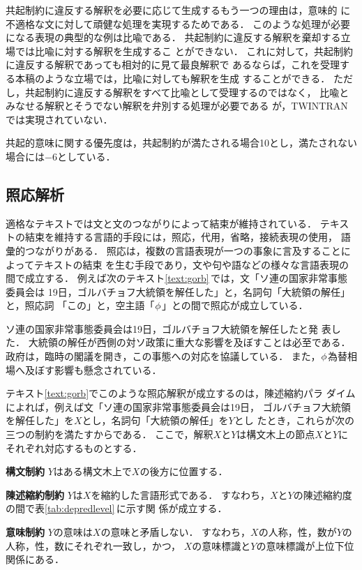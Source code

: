 共起制約に違反する解釈を必要に応じて生成するもう一つの理由は，意味的
に不適格な文に対して頑健な処理を実現するためである．
このような処理が必要になる表現の典型的な例は比喩である．
共起制約に違反する解釈を棄却する立場では比喩に対する解釈を生成するこ
とができない．
これに対して，共起制約に違反する解釈であっても相対的に見て最良解釈で
あるならば，これを受理する本稿のような立場では，比喩に対しても解釈を生成
することができる．
ただし，共起制約に違反する解釈をすべて比喩として受理するのではなく，
比喩とみなせる解釈とそうでない解釈を弁別する処理が必要である
\cite{Wilks78,Ferrari96}が，TWINTRANでは実現されていない．

共起的意味に関する優先度は，共起制約が満たされる場合10とし，満たされない
場合には$-6$としている．

\subsection{照応解析}
\label{sec:analysis:integ:cor}

適格なテキストでは文と文のつながりによって結束が維持されている．
テキストの結束を維持する言語的手段には，照応，代用，省略，接続表現の使用，
語彙的つながりがある\cite{Halliday76}．
照応は，複数の言語表現が一つの事象に言及することによってテキストの結束
を生む手段であり，文や句や語などの様々な言語表現の間で成立する．
例えば次のテキスト\ref{text:gorb}\,では，文「ソ連の国家非常事態委員会は
19日，ゴルバチョフ大統領を解任した」と，名詞句「大統領の解任」と，照応詞
「この」と，空主語「$\phi_{}$」との間で照応が成立している．
\begin{TEXT}
\text ソ連の国家非常事態委員会は19日，ゴルバチョフ大統領を解任したと発
表した．
大統領の解任が西側の対ソ政策に重大な影響を及ぼすことは必至である．
政府は，臨時の閣議を開き，この事態への対応を協議している．
また，$\phi_{}$為替相場へ及ぼす影響も懸念されている．
\label{text:gorb}
\end{TEXT}
テキスト\ref{text:gorb}でこのような照応解釈が成立するのは，陳述縮約パラ
ダイム\cite{Jelinek95}によれば，例えば文「ソ連の国家非常事態委員会は19日，
ゴルバチョフ大統領を解任した」を$X$とし，名詞句「大統領の解任」を$Y$とし
たとき，これらが次の三つの制約を満たすからである．
ここで，解釈$X$と$Y$は構文木上の節点$X$と$Y$にそれぞれ対応するものとする．
\begin{DEPLED}
\item[\bf 構文制約] $Y$はある構文木上で$X$の後方に位置する．
\item[\bf 陳述縮約制約] $Y$は$X$を縮約した言語形式である．
すなわち，$X$と$Y$の陳述縮約度の間で表\ref{tab:depredlevel}\,に示す関
係が成立する．
\item[\bf 意味制約] $Y$の意味は$X$の意味と矛盾しない．
すなわち，$X$の人称，性，数が$Y$の人称，性，数にそれぞれ一致し，かつ，
$X$の意味標識と$Y$の意味標識が上位下位関係にある．
\end{DEPLED}

